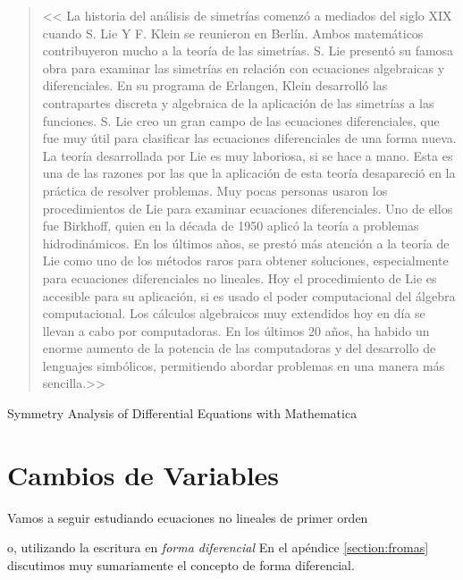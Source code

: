  
\begin{quote}
<< La historia del análisis de simetrías comenzó a mediados del siglo XIX cuando S. Lie
Y F. Klein se reunieron en Berlín. Ambos matemáticos contribuyeron mucho a la teoría de las
simetrías. S. Lie presentó su famosa obra para examinar las simetrías en relación con
ecuaciones algebraicas y diferenciales. En su programa de Erlangen, Klein desarrolló las contrapartes discreta y algebraica de la aplicación de las simetrías a las funciones. S. Lie
creo un gran campo de las ecuaciones diferenciales, que fue muy útil para
clasificar las ecuaciones diferenciales de una forma nueva. La teoría desarrollada por Lie es
muy laboriosa, si se hace a mano. Esta es una de las razones por las que la aplicación de
esta teoría desapareció en la práctica de resolver problemas. Muy pocas personas usaron los procedimientos de  Lie para examinar ecuaciones diferenciales. Uno de ellos fue Birkhoff,
quien en la década de 1950 aplicó la teoría a problemas hidrodinámicos. En los últimos años,
 se prestó más atención a la teoría de Lie como uno de los métodos raros para obtener
soluciones, especialmente para ecuaciones diferenciales no lineales. Hoy el procedimiento de Lie es
accesible para su aplicación, si es usado el poder computacional del álgebra computacional. 
Los cálculos algebraicos muy extendidos hoy en día se llevan a cabo por computadoras. 
En los últimos 20 años, ha habido un enorme aumento de la potencia de  las computadoras y del desarrollo de lenguajes simbólicos, permitiendo abordar problemas en una
manera más sencilla.>>
\end{quote}
  

\begin{flushright}

Symmetry Analysis of
Differential Equations
with Mathematica\textregistered\\
\cite{GerdBaumann578}

\end{flushright}




\section{Cambios de Variables}

Vamos a seguir estudiando ecuaciones no lineales de primer orden

o, utilizando  la escritura en  \emph{forma diferencial}
En el apéndice \ref{section:fromas} discutimos muy sumariamente el concepto de forma diferencial.

